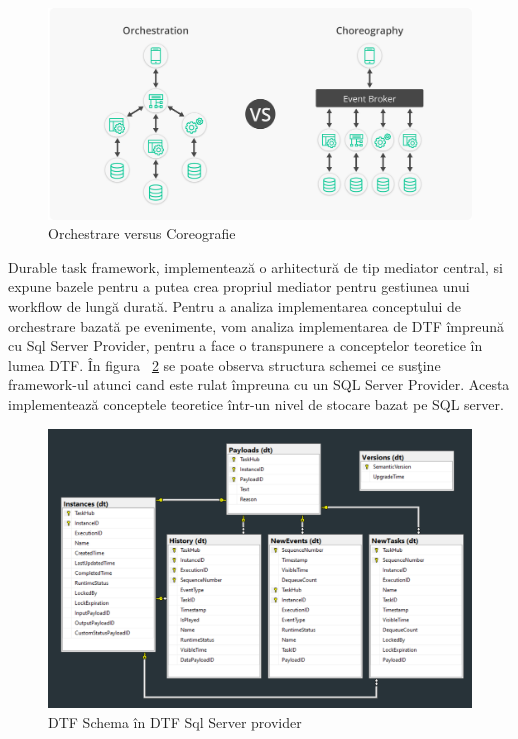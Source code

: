 \begin{figure}[h]
\begin{center}
        \includegraphics[width=1\textwidth]{images/Orchestration-VS-Choreography}
			 \caption{Orchestrare versus Coreografie}
			 \label{fig:orch_vs_coreografie}
\end{center}
\end{figure}

\par Durable task framework, implementează o arhitectură de tip mediator central, si expune bazele pentru a putea crea propriul mediator pentru gestiunea unui workflow de lungă durată. Pentru a analiza implementarea conceptului de orchestrare bazată pe evenimente, vom analiza implementarea de DTF împreună cu Sql Server Provider, pentru a face o transpunere a conceptelor teoretice în lumea DTF. În figura ~\ref{fig:sql-server-provider} se poate observa structura schemei ce susţine framework-ul atunci cand este rulat împreuna cu un SQL Server Provider. Acesta implementează conceptele teoretice într-un nivel de stocare bazat pe SQL server. 
 
 \begin{figure}[h]
\begin{center}
        \includegraphics[width=1\textwidth]{images/sql-server-provider}
			 \caption{DTF Schema în DTF Sql Server provider}
			 \label{fig:sql-server-provider}
\end{center}
\end{figure}


